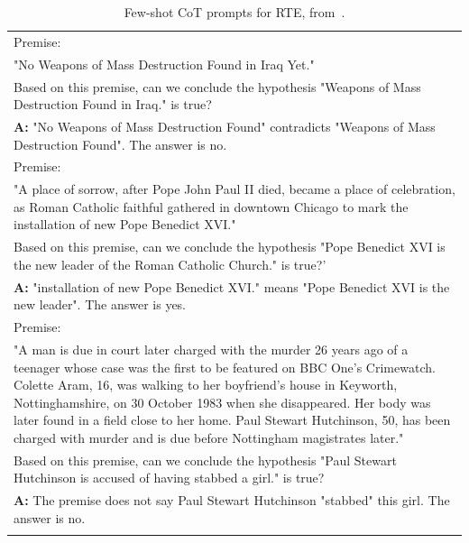 \begin{table}[h]
    \caption{
    Few-shot CoT prompts for RTE, from~\cite{Wang2022RationaleAugmentedEI}.
    }
    \centering
    \small
    \begin{tabular}{p{14cm}}
        \toprule
        Premise:\\
        "No Weapons of Mass Destruction Found in Iraq Yet."\\
        Based on this premise, can we conclude the hypothesis "Weapons of Mass Destruction Found in Iraq." is true?\\
        \vspace{-1mm}
        \textbf{A:} "No Weapons of Mass Destruction Found" contradicts "Weapons of Mass Destruction Found". The answer is no.\\
        \vspace{0mm}
        Premise:\\
        "A place of sorrow, after Pope John Paul II died, became a place of celebration, as Roman Catholic faithful gathered in downtown Chicago to mark the installation of new Pope Benedict XVI."\\
        Based on this premise, can we conclude the hypothesis "Pope Benedict XVI is the new leader of the Roman Catholic Church." is true?'\\
        \vspace{-1mm}
        \textbf{A:} "installation of new Pope Benedict XVI." means "Pope Benedict XVI is the new leader". The answer is yes. \\
        \vspace{0mm}
        Premise:\\
        "A man is due in court later charged with the murder 26 years ago of a teenager whose case was the first to be featured on BBC One's Crimewatch. Colette Aram, 16, was walking to her boyfriend's house in Keyworth, Nottinghamshire, on 30 October 1983 when she disappeared. Her body was later found in a field close to her home. Paul Stewart Hutchinson, 50, has been charged with murder and is due before Nottingham magistrates later."\\
        Based on this premise, can we conclude the hypothesis "Paul Stewart Hutchinson is accused of having stabbed a girl." is true?\\
        \vspace{-1mm}
        \textbf{A:} The premise does not say Paul Stewart Hutchinson "stabbed" this girl. The answer is no.\\
        \vspace{0mm}

\end{tabular}
\end{table}
